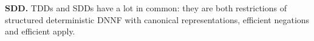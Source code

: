 \documentclass[a4paper,UKenglish,cleveref, autoref, thm-restate]{lipics-v2021}
\begin{document}
\textbf{SDD.} TDDs and SDDs have a lot in common: they are both restrictions of structured deterministic DNNF with canonical representations, efficient negations and efficient apply. 
%
%
%
\end{document}

